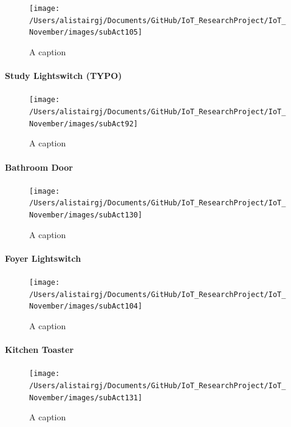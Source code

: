 \documentclass[11pt,]{article}
\let\oldparagraph\paragraph
\renewcommand{\paragraph}[1]{\oldparagraph{#1}\mbox{}}
\begin{document}
\begin{figure}[H]
\texttt{[image: /Users/alistairgj/Documents/GitHub/IoT\_ResearchProject/IoT\_November/images/subAct105]} \caption{A caption}\label{fig:subAct105}
\end{figure}

\hypertarget{study-lightswitch-typo}{%
\paragraph{Study Lightswitch (TYPO)}\label{study-lightswitch-typo}}

\begin{figure}[H]
\texttt{[image: /Users/alistairgj/Documents/GitHub/IoT\_ResearchProject/IoT\_November/images/subAct92]} \caption{A caption}\label{fig:subAct92}
\end{figure}

\hypertarget{bathroom-door}{%
\paragraph{Bathroom Door}\label{bathroom-door}}

\begin{figure}[H]
\texttt{[image: /Users/alistairgj/Documents/GitHub/IoT\_ResearchProject/IoT\_November/images/subAct130]} \caption{A caption}\label{fig:subAct130}
\end{figure}

\hypertarget{foyer-lightswitch}{%
\paragraph{Foyer Lightswitch}\label{foyer-lightswitch}}

\begin{figure}[H]
\texttt{[image: /Users/alistairgj/Documents/GitHub/IoT\_ResearchProject/IoT\_November/images/subAct104]} \caption{A caption}\label{fig:subAct104}
\end{figure}

\hypertarget{kitchen-toaster}{%
\paragraph{Kitchen Toaster}\label{kitchen-toaster}}

\begin{figure}[H]
\texttt{[image: /Users/alistairgj/Documents/GitHub/IoT\_ResearchProject/IoT\_November/images/subAct131]} \caption{A caption}\label{fig:subAct131}
\end{figure}
\end{document}
